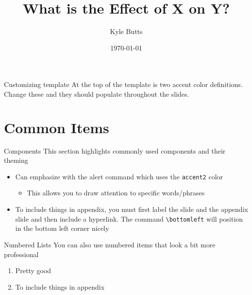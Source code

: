 \documentclass[aspectratio=169,t,11pt,table]{beamer}
\title{What is the Effect of X on Y?}
\date{\today}
\author{Kyle Butts}
\begin{document}
\begin{frame}
\maketitle

\end{frame}

\begin{frame}{Customizing template}
  At the top of the template is two accent color definitions. Change these and they should populate throughout the slides.
\end{frame}

\section{Common Items}

\begin{frame}{Components}\label{main1}
  This section highlights commonly used components and their theming

  \begin{itemize}
    \item Can emphasize with \alert{the alert command} which uses the \texttt{accent2} color
    
    \begin{itemize}
      \item This allows you to draw attention to specific words/phrases
    \end{itemize}
    
    \item To include things in appendix, you must first label the slide and the appendix slide and then include a hyperlink. The command \texttt{\textbackslash bottomleft} will position in the bottom left corner nicely
  \end{itemize}

\end{frame}

\begin{frame}{Numbered Lists}
  You can also use numbered items that look a bit more professional

  \begin{enumerate}
    \item Pretty good
    
    \item To include things in appendix
  \end{enumerate}
\end{frame}
\end{document}
